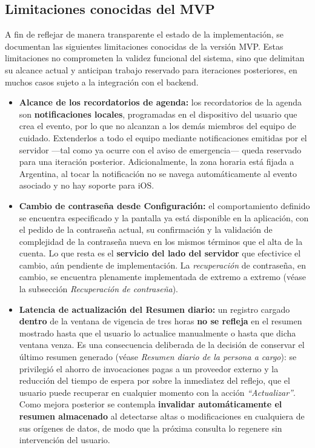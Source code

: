 \documentclass[a4paper,12pt]{article}
\begin{document}
    \subsection{Limitaciones conocidas del MVP}
    \par A fin de reflejar de manera transparente el estado de la implementación, se documentan las siguientes limitaciones conocidas de la versión MVP. Estas limitaciones no comprometen la validez funcional del sistema, sino que delimitan su alcance actual y anticipan trabajo reservado para iteraciones posteriores, en muchos casos sujeto a la integración con el backend.
    \begin{itemize}
        \item \textbf{Alcance de los recordatorios de agenda:} los recordatorios de la agenda son \textbf{notificaciones locales}, programadas en el dispositivo del usuario que crea el evento, por lo que no alcanzan a los demás miembros del equipo de cuidado. Extenderlos a todo el equipo mediante notificaciones emitidas por el servidor —tal como ya ocurre con el aviso de emergencia— queda reservado para una iteración posterior. Adicionalmente, la zona horaria está fijada a Argentina, al tocar la notificación no se navega automáticamente al evento asociado y no hay soporte para iOS.
        \item \textbf{Cambio de contraseña desde Configuración:} el comportamiento definido se encuentra especificado y la pantalla ya está disponible en la aplicación, con el pedido de la contraseña actual, su confirmación y la validación de complejidad de la contraseña nueva en los mismos términos que el alta de la cuenta. Lo que resta es el \textbf{servicio del lado del servidor} que efectivice el cambio, aún pendiente de implementación. La \textit{recuperación} de contraseña, en cambio, se encuentra plenamente implementada de extremo a extremo (véase la subsección \textit{Recuperación de contraseña}).
        \item \textbf{Latencia de actualización del Resumen diario:} un registro cargado \textbf{dentro} de la ventana de vigencia de tres horas \textbf{no se refleja} en el resumen mostrado hasta que el usuario lo actualice manualmente o hasta que dicha ventana venza. Es una consecuencia deliberada de la decisión de conservar el último resumen generado (véase \textit{Resumen diario de la persona a cargo}): se privilegió el ahorro de invocaciones pagas a un proveedor externo y la reducción del tiempo de espera por sobre la inmediatez del reflejo, que el usuario puede recuperar en cualquier momento con la acción \textit{``Actualizar''}. Como mejora posterior se contempla \textbf{invalidar automáticamente el resumen almacenado} al detectarse altas o modificaciones en cualquiera de sus orígenes de datos, de modo que la próxima consulta lo regenere sin intervención del usuario.

\end{itemize}
\end{document}
